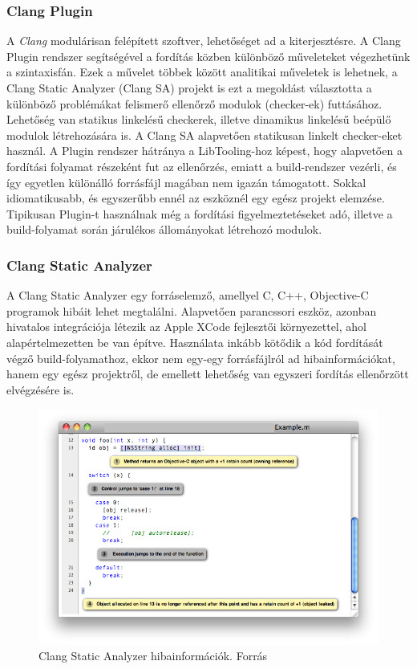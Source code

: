 \documentclass[a4paper,12pt]{report}
\begin{document}
\subsubsection{Clang Plugin}
A \emph{Clang} modulárisan felépített szoftver, lehetőséget ad a kiterjesztésre. A Clang Plugin rendszer segítségével a fordítás közben különböző műveleteket végezhetünk a szintaxisfán. Ezek a művelet többek között analitikai műveletek is lehetnek, a Clang Static Analyzer (Clang SA) projekt is ezt a megoldást választotta a különböző problémákat felismerő ellenőrző modulok (checker-ek) futtásához. Lehetőség van statikus linkelésű checkerek, illetve dinamikus linkelésű beépülő modulok létrehozására is. A Clang SA alapvetően statikusan linkelt checker-eket használ. A Plugin rendszer hátránya a LibTooling-hoz képest, hogy alapvetően a fordítási folyamat részeként fut az ellenőrzés, emiatt a build-rendszer vezérli, és így egyetlen különálló forrásfájl magában nem igazán támogatott. Sokkal idiomatikusabb, és egyszerűbb ennél az eszköznél egy egész projekt elemzése. Tipikusan Plugin-t használnak még a fordítási figyelmeztetéseket adó, illetve a build-folyamat során járulékos állományokat létrehozó modulok.

\subsubsection{Clang Static Analyzer}
A Clang Static Analyzer egy forráselemző, amellyel C, C++, Objective-C programok hibáit lehet megtalálni. Alapvetően parancssori eszköz, azonban hivatalos integrációja létezik az Apple XCode fejlesztői környezettel, ahol alapértelmezetten be van építve. Használata inkább kötődik a kód fordítását végző build-folyamathoz, ekkor nem egy-egy forrásfájlról ad hibainformációkat, hanem egy egész projektről, de emellett lehetőség van egyszeri fordítás ellenőrzött elvégzésére is.

\begin{figure}[h]
\caption{Clang Static Analyzer hibainformációk. Forrás \cite{clangsaimage}}
\centering
\includegraphics[scale=0.6]{analyzer_html.png}
\end{figure}
\end{document}
